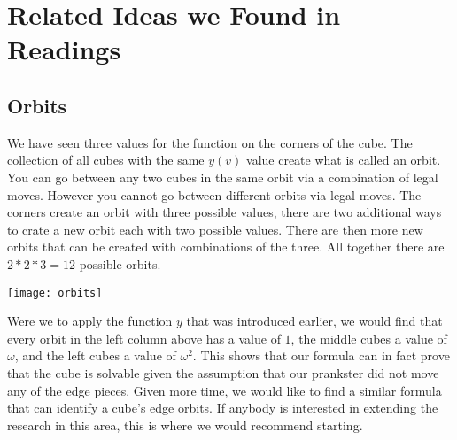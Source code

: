 \documentclass{article}
\begin{document}
\section{Related Ideas we Found in Readings}
\subsection{Orbits}

We have seen three values for the function on the corners of the cube. The collection of all cubes with the same $y(v)$ value create what is called an orbit. You can go between any two cubes in the same orbit via a combination of legal moves. However you cannot go between different orbits via legal moves. The corners create an orbit with three possible values, there are two additional ways to crate a  new orbit each with two possible values. There are then more new orbits that can be created with combinations of the three. All together there are $2*2*3=12$ possible orbits.

\texttt{[image: orbits]}

Were we to apply the function $y$ that was introduced earlier, we would find that every orbit in the left column above has a value of $1$, the middle cubes a value of $\omega$, and the left cubes a value of $\omega^2$. This shows that our formula can in fact prove that the cube is solvable given the assumption that our prankster did not move any of the edge pieces. Given more time, we would like to find a similar formula that can identify a cube's edge orbits. If anybody is interested in extending the research in this area, this is where we would recommend starting.
\end{document}
